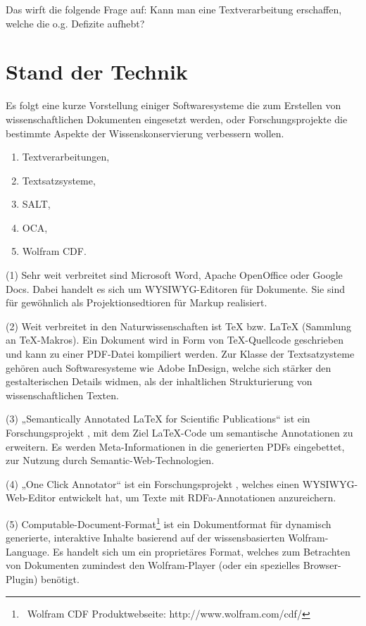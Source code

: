 Das wirft die folgende Frage auf: Kann man eine Textverarbeitung erschaffen, welche die o.g. Defizite aufhebt?

 
\section{Stand der Technik}\label{stand-der-technik}
 
Es folgt eine kurze Vorstellung einiger Softwaresysteme die zum Erstellen von wissenschaftlichen Dokumenten eingesetzt werden, oder Forschungsprojekte die bestimmte Aspekte der Wissenskonservierung verbessern wollen.

 
\begin{enumerate}

\item Textverarbeitungen,
\item Textsatzsysteme,
\item SALT,
\item OCA,
\item Wolfram CDF.
\end{enumerate}
 
(1) Sehr weit verbreitet sind Microsoft Word, Apache OpenOffice oder Google Docs. Dabei handelt es sich um WYSIWYG-Editoren für Dokumente. Sie sind für gewöhnlich als Projektionsedtioren für Markup realisiert.

 
(2) Weit verbreitet in den Naturwissenschaften ist TeX bzw. LaTeX (Sammlung an TeX-Makros). Ein Dokument wird in Form von TeX-Quellcode geschrieben und kann zu einer PDF-Datei kompiliert werden. Zur Klasse der Textsatzysteme gehören auch Softwaresysteme wie Adobe InDesign, welche sich stärker den gestalterischen Details widmen, als der inhaltlichen Strukturierung von wissenschaftlichen Texten.

 
(3) „Semantically Annotated LaTeX for Scientific Publications“ ist ein Forschungsprojekt \citep{Groza}, mit dem Ziel LaTeX-Code um semantische Annotationen zu erweitern. Es werden Meta-Informationen in die generierten PDFs eingebettet, zur Nutzung durch Semantic-Web-Technologien.

 
(4) „One Click Annotator“ ist ein Forschungsprojekt \citep{Heese}, welches einen WYSIWYG-Web-Editor entwickelt hat, um Texte mit RDFa-Annotationen anzureichern.

 
(5) Computable-Document-Format\footnote{~Wolfram CDF Produktwebseite: http://www.wolfram.com/cdf/} ist ein Dokumentformat für dynamisch generierte, interaktive Inhalte basierend auf der wissensbasierten Wolfram-Language. Es handelt sich um ein proprietäres Format, welches zum Betrachten von Dokumenten zumindest den Wolfram-Player (oder ein spezielles Browser-Plugin) benötigt.


